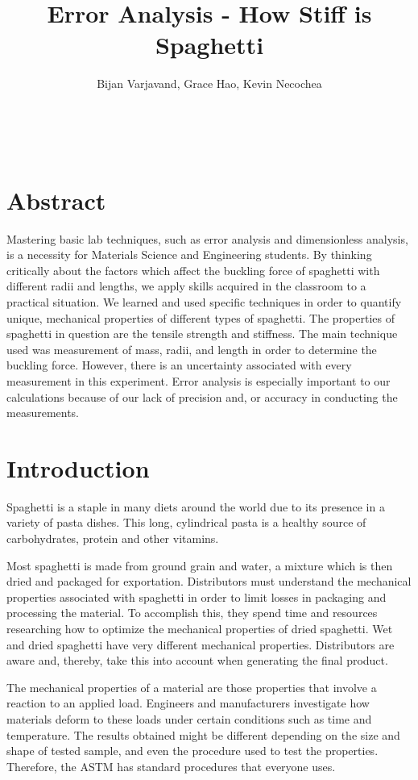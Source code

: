 \documentclass[12pt]{article}
\author{Bijan Varjavand, Grace Hao, Kevin Necochea}
\title{Error Analysis - How Stiff is Spaghetti}
\renewcommand{\baselinestretch}{1.5}
\begin{document}
\maketitle
\ \\[1in]
\centering
\renewcommand{\baselinestretch}{1.0}
\section{Abstract}
Mastering basic lab techniques, such as error analysis and dimensionless analysis, is a necessity for Materials Science and Engineering students. By thinking critically about the factors which affect the buckling force of spaghetti with different radii and lengths, we apply skills acquired in the classroom to a practical situation. We learned and used specific techniques in order to quantify unique, mechanical properties of different types of spaghetti. The properties of spaghetti in question are the tensile strength and stiffness. The main technique used was measurement of mass, radii, and length in order to determine the buckling force. However, there is an uncertainty associated with every measurement in this experiment. Error analysis is especially important to our calculations because of our lack of precision and, or accuracy in conducting the measurements. 

\clearpage

\raggedright
\linespread{1.6}
\renewcommand{\baselinestretch}{1.5}
\section{Introduction}
Spaghetti is a staple in many diets around the world due to its presence in a variety of pasta dishes. This long, cylindrical pasta is a healthy source of carbohydrates, protein and other vitamins.

Most spaghetti is made from ground grain and water, a mixture which is then dried and packaged for exportation. Distributors must understand the mechanical properties associated with spaghetti in order to limit losses in packaging and processing the material. To accomplish this, they spend time and resources researching how to optimize the mechanical properties of dried spaghetti. Wet and dried spaghetti have very different mechanical properties. Distributors are aware and, thereby, take this into account when generating the final product.

The mechanical properties of a material are those properties that involve a reaction to an applied load. Engineers and manufacturers investigate how materials deform to these loads under certain conditions such as time and temperature. The results obtained might be different depending on the size and shape of tested sample, and even the procedure used to test the properties. Therefore, the ASTM has standard procedures that everyone uses.
\end{document}
